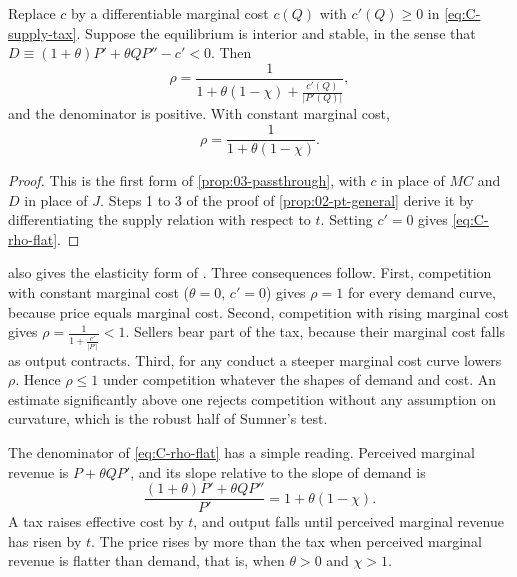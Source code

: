 \begin{proposition}\label{prop:C-passthrough}
Replace $c$ by a differentiable marginal cost $c(Q)$ with $c'(Q) \ge 0$ in \eqref{eq:C-supply-tax}. Suppose the
equilibrium is interior and stable, in the sense that $D \equiv (1 + \theta)P' + \theta QP'' - c' < 0$. Then
\begin{equation}\label{eq:C-rho-general}
\rho = \frac{1}{1 + \theta(1 - \chi) + \frac{c'(Q)}{\lvert P'(Q)\rvert}} ,
\end{equation}
and the denominator is positive. With constant marginal cost,
\begin{equation}\label{eq:C-rho-flat}
\rho = \frac{1}{1 + \theta(1 - \chi)} .
\end{equation}
\end{proposition}

\begin{proof}
This is the first form of \cref{prop:03-passthrough}, with $c$ in place of $MC$ and $D$ in place of $J$. Steps 1 to 3
of the proof of \cref{prop:02-pt-general} derive it by differentiating the supply relation with respect to $t$.
Setting $c' = 0$ gives \eqref{eq:C-rho-flat}.
\end{proof}

 also gives the elasticity form of \citet{WeylFabinger2013}. Three consequences follow. First, competition with constant marginal cost
($\theta = 0$, $c' = 0$) gives $\rho = 1$ for every demand curve, because price equals marginal cost. Second,
competition with rising marginal cost gives $\rho = \frac{1}{1 + \frac{c'}{\lvert P'\rvert}} < 1$. Sellers bear part
of the tax, because their marginal cost falls as output contracts. Third, for any conduct a steeper marginal cost
curve lowers $\rho$. Hence $\rho \le 1$ under competition whatever the shapes of demand and cost. An estimate
significantly above one rejects competition without any assumption on curvature, which is the robust half of
Sumner's test.

The denominator of \eqref{eq:C-rho-flat} has a simple reading. Perceived marginal revenue is $P + \theta QP'$, and
its slope relative to the slope of demand is
\begin{equation*}
\frac{(1 + \theta)P' + \theta QP''}{P'} = 1 + \theta(1 - \chi) .
\end{equation*}
A tax raises effective cost by $t$, and output falls until perceived marginal revenue has risen by $t$. The price
rises by more than the tax when perceived marginal revenue is flatter than demand, that is, when $\theta > 0$ and
$\chi > 1$.

